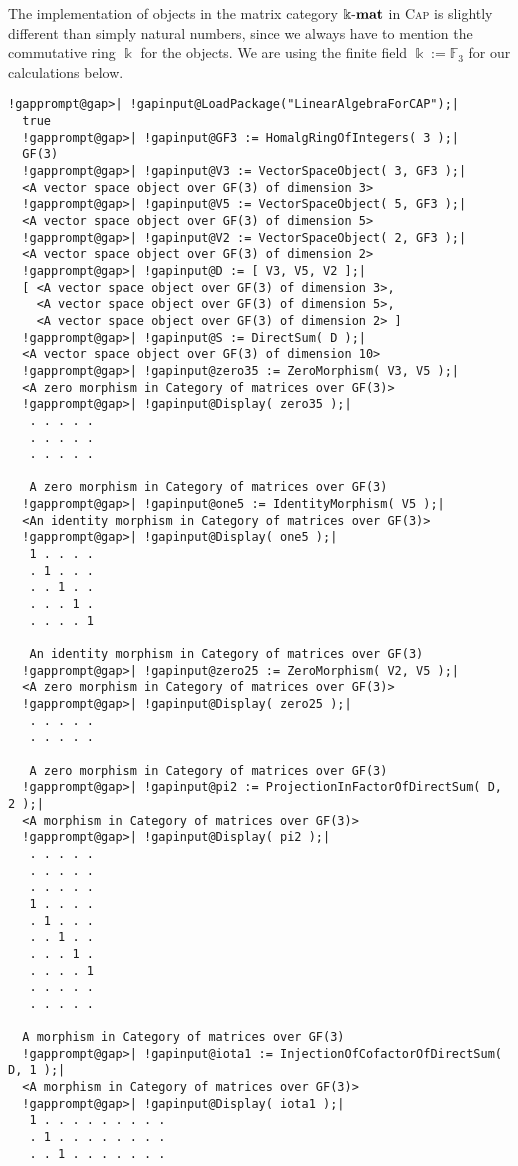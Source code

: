 \begin{computation}
The implementation of objects in the matrix category $\Bbbk\textnormal{-}\mathbf{mat}$ in \textsc{Cap} is slightly different than simply natural numbers, since
we always have to mention the commutative ring $\Bbbk$ for the objects. We are using the finite field
$\Bbbk := \mathbb{F}_{3}$ for our calculations below.
\begin{Verbatim}[commandchars=!@|,fontsize=\small,frame=single,label=Example]
  !gapprompt@gap>| !gapinput@LoadPackage("LinearAlgebraForCAP");|
  true
  !gapprompt@gap>| !gapinput@GF3 := HomalgRingOfIntegers( 3 );|
  GF(3)
  !gapprompt@gap>| !gapinput@V3 := VectorSpaceObject( 3, GF3 );|
  <A vector space object over GF(3) of dimension 3>
  !gapprompt@gap>| !gapinput@V5 := VectorSpaceObject( 5, GF3 );|
  <A vector space object over GF(3) of dimension 5>
  !gapprompt@gap>| !gapinput@V2 := VectorSpaceObject( 2, GF3 );|
  <A vector space object over GF(3) of dimension 2>
  !gapprompt@gap>| !gapinput@D := [ V3, V5, V2 ];|
  [ <A vector space object over GF(3) of dimension 3>,
    <A vector space object over GF(3) of dimension 5>,
    <A vector space object over GF(3) of dimension 2> ]
  !gapprompt@gap>| !gapinput@S := DirectSum( D );|
  <A vector space object over GF(3) of dimension 10>
  !gapprompt@gap>| !gapinput@zero35 := ZeroMorphism( V3, V5 );|
  <A zero morphism in Category of matrices over GF(3)>
  !gapprompt@gap>| !gapinput@Display( zero35 );|
   . . . . .
   . . . . .
   . . . . .
   
   A zero morphism in Category of matrices over GF(3)
  !gapprompt@gap>| !gapinput@one5 := IdentityMorphism( V5 );|
  <An identity morphism in Category of matrices over GF(3)>
  !gapprompt@gap>| !gapinput@Display( one5 );|
   1 . . . .
   . 1 . . .
   . . 1 . .
   . . . 1 .
   . . . . 1
   
   An identity morphism in Category of matrices over GF(3)
  !gapprompt@gap>| !gapinput@zero25 := ZeroMorphism( V2, V5 );|
  <A zero morphism in Category of matrices over GF(3)>
  !gapprompt@gap>| !gapinput@Display( zero25 );|
   . . . . .
   . . . . .
   
   A zero morphism in Category of matrices over GF(3)
  !gapprompt@gap>| !gapinput@pi2 := ProjectionInFactorOfDirectSum( D, 2 );|
  <A morphism in Category of matrices over GF(3)>
  !gapprompt@gap>| !gapinput@Display( pi2 );|
   . . . . .
   . . . . .
   . . . . .
   1 . . . .
   . 1 . . .
   . . 1 . .
   . . . 1 .
   . . . . 1
   . . . . .
   . . . . .
  
  A morphism in Category of matrices over GF(3)
  !gapprompt@gap>| !gapinput@iota1 := InjectionOfCofactorOfDirectSum( D, 1 );|
  <A morphism in Category of matrices over GF(3)>
  !gapprompt@gap>| !gapinput@Display( iota1 );|
   1 . . . . . . . . .
   . 1 . . . . . . . .
   . . 1 . . . . . . .
   

\end{Verbatim}
\end{computation}

